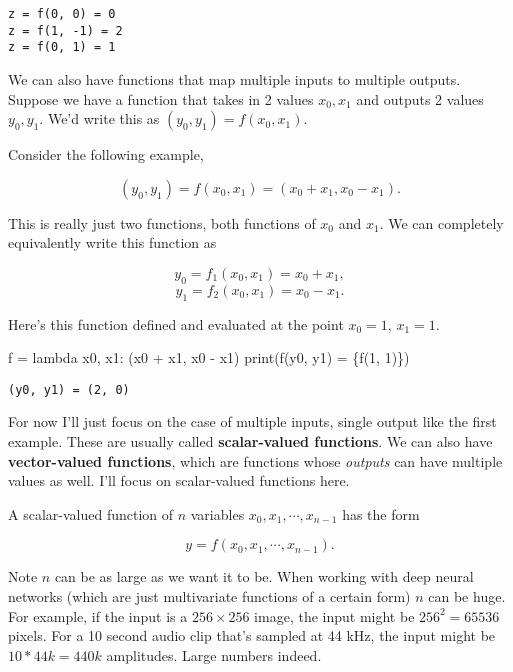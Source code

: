 \documentclass[
  letterpaper,
  DIV=11,
  numbers=noendperiod]{scrreprt}
\newenvironment{Shaded}{\begin{snugshade}}{\end{snugshade}}
\newcommand{\BuiltInTok}[1]{\textcolor[rgb]{0.00,0.23,0.31}{#1}}
\newcommand{\DecValTok}[1]{\textcolor[rgb]{0.68,0.00,0.00}{#1}}
\newcommand{\KeywordTok}[1]{\textcolor[rgb]{0.00,0.23,0.31}{#1}}
\newcommand{\NormalTok}[1]{\textcolor[rgb]{0.00,0.23,0.31}{#1}}
\newcommand{\OperatorTok}[1]{\textcolor[rgb]{0.37,0.37,0.37}{#1}}
\newcommand{\SpecialCharTok}[1]{\textcolor[rgb]{0.37,0.37,0.37}{#1}}
\newcommand{\SpecialStringTok}[1]{\textcolor[rgb]{0.13,0.47,0.30}{#1}}
\begin{document}
\begin{verbatim}
z = f(0, 0) = 0
z = f(1, -1) = 2
z = f(0, 1) = 1
\end{verbatim}

We can also have functions that map multiple inputs to multiple outputs.
Suppose we have a function that takes in 2 values \(x_0, x_1\) and
outputs 2 values \(y_0, y_1\). We'd write this as
\((y_0, y_1) = f(x_0, x_1)\).

Consider the following example,

\[(y_0, y_1) = f(x_0, x_1) = (x_0+x_1, x_0-x_1).\]

This is really just two functions, both functions of \(x_0\) and
\(x_1\). We can completely equivalently write this function as

\[y_0 = f_1(x_0, x_1) = x_0+x_1,\] \[y_1 = f_2(x_0, x_1) = x_0-x_1.\]

Here's this function defined and evaluated at the point \(x_0=1\),
\(x_1=1\).

\begin{Shaded}
\begin{Highlighting}[]
\NormalTok{f }\OperatorTok{=} \KeywordTok{lambda}\NormalTok{ x0, x1: (x0 }\OperatorTok{+}\NormalTok{ x1, x0 }\OperatorTok{{-}}\NormalTok{ x1)}
\BuiltInTok{print}\NormalTok{(}\SpecialStringTok{f\textquotesingle{}(y0, y1) = }\SpecialCharTok{\{}\NormalTok{f(}\DecValTok{1}\NormalTok{, }\DecValTok{1}\NormalTok{)}\SpecialCharTok{\}}\SpecialStringTok{\textquotesingle{}}\NormalTok{)}
\end{Highlighting}
\end{Shaded}

\begin{verbatim}
(y0, y1) = (2, 0)
\end{verbatim}

For now I'll just focus on the case of multiple inputs, single output
like the first example. These are usually called \textbf{scalar-valued
functions}. We can also have \textbf{vector-valued functions}, which are
functions whose \emph{outputs} can have multiple values as well. I'll
focus on scalar-valued functions here.

A scalar-valued function of \(n\) variables
\(x_0, x_1, \cdots, x_{n-1}\) has the form

\[y = f(x_0, x_1, \cdots, x_{n-1}).\]

Note \(n\) can be as large as we want it to be. When working with deep
neural networks (which are just multivariate functions of a certain
form) \(n\) can be huge. For example, if the input is a
\(256 \times 256\) image, the input might be \(256^2=65536\) pixels. For
a 10 second audio clip that's sampled at 44 kHz, the input might be
\(10*44k=440k\) amplitudes. Large numbers indeed.
\end{document}
